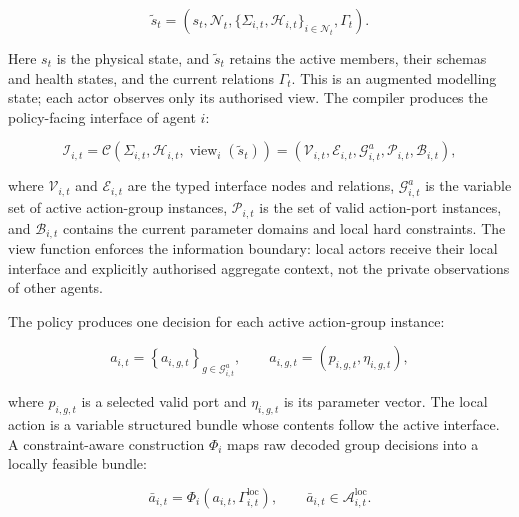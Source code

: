 \begin{equation}
\tilde{s}_t =
\left(
 s_t,
 \mathcal{N}_t,
 \{\Sigma_{i,t},\mathcal{H}_{i,t}\}_{i\in\mathcal{N}_t},
 \Gamma_t
\right).
\label{eq:timg-augmented-state}
\end{equation}

Here $s_t$ is the physical state, and $\tilde{s}_t$ retains the active members, their schemas and health states, and the current relations $\Gamma_t$. This is an augmented modelling state; each actor observes only its authorised view. The compiler produces the policy-facing interface of agent $i$:

\begin{equation}
\mathcal{I}_{i,t}
=
\mathcal{C}
\left(
\Sigma_{i,t},
\mathcal{H}_{i,t},
\operatorname{view}_i(\tilde{s}_t)
\right)
=
\left(
\mathcal{V}_{i,t},
\mathcal{E}_{i,t},
\mathcal{G}_{i,t}^{a},
\mathcal{P}_{i,t},
\mathcal{B}_{i,t}
\right),
\label{eq:interface-compiler}
\end{equation}

where $\mathcal{V}_{i,t}$ and $\mathcal{E}_{i,t}$ are the typed interface nodes and relations, $\mathcal{G}_{i,t}^{a}$ is the variable set of active action-group instances, $\mathcal{P}_{i,t}$ is the set of valid action-port instances, and $\mathcal{B}_{i,t}$ contains the current parameter domains and local hard constraints. The view function enforces the information boundary: local actors receive their local interface and explicitly authorised aggregate context, not the private observations of other agents.

The policy produces one decision for each active action-group instance:

\begin{equation}
a_{i,t}
=
\left\{
 a_{i,g,t}
\right\}_{g\in\mathcal{G}_{i,t}^{a}},
\qquad
 a_{i,g,t}
=
\left(
 p_{i,g,t},\eta_{i,g,t}
\right),
\label{eq:local-action-bundle}
\end{equation}

where $p_{i,g,t}$ is a selected valid port and $\eta_{i,g,t}$ is its parameter vector. The local action is a variable structured bundle whose contents follow the active interface. A constraint-aware construction $\Phi_i$ maps raw decoded group decisions into a locally feasible bundle:

\begin{equation}
\bar{a}_{i,t}
=
\Phi_i
\left(
 a_{i,t},
 \Gamma^{\mathrm{loc}}_{i,t}
\right),
\qquad
\bar{a}_{i,t}\in\mathcal{A}^{\mathrm{loc}}_{i,t}.
\label{eq:local-feasible-bundle}
\end{equation}

